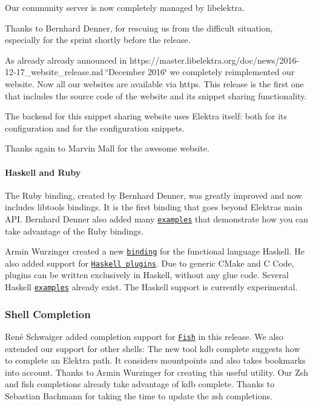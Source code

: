 Our community server is now completely managed by libelektra.

Thanks to Bernhard Denner, for rescuing us from the difficult situation, especially for the sprint shortly before the release.

As already already announced in https\+://master.libelektra.\+org/doc/news/2016-\/12-\/17\+\_\+website\+\_\+release.md \char`\"{}\+December 2016\char`\"{} we completely reimplemented our website. Now all our websites are available via https. This release is the first one that includes the source code of the website and its snippet sharing functionality.

The backend for this snippet sharing website uses Elektra itself\+: both for its configuration and for the configuration snippets.

Thanks again to Marvin Mall for the awesome website.

\paragraph*{Haskell and Ruby}

The Ruby binding, created by Bernhard Denner, was greatly improved and now includes libtools bindings. It is the first binding that goes beyond Elektra\textquotesingle{}s main A\+PI. Bernhard Denner also added many \href{https://master.libelektra.org/src/bindings/swig/ruby/examples}{\tt examples} that demonstrate how you can take advantage of the Ruby bindings.

Armin Wurzinger created a new \href{https://master.libelektra.org/src/bindings/haskell}{\tt binding} for the functional language Haskell. He also added support for \href{https://master.libelektra.org/src/plugins/haskell}{\tt Haskell plugins}. Due to generic C\+Make and C Code, plugins can be written exclusively in Haskell, without any glue code. Several Haskell \href{https://master.libelektra.org/src/bindings/haskell/examples}{\tt examples} already exist. The Haskell support is currently experimental.

\subsubsection*{Shell Completion}

René Schwaiger added completion support for \href{http://fishshell.com}{\tt Fish} in this release. We also extended our support for other shells\+: The new tool {\ttfamily kdb complete} suggests how to complete an Elektra path. It considers mountpoints and also takes bookmarks into account. Thanks to Armin Wurzinger for creating this useful utility. Our Zsh and fish completions already take advantage of {\ttfamily kdb complete}. Thanks to Sebastian Bachmann for taking the time to update the {\ttfamily zsh} completions.

